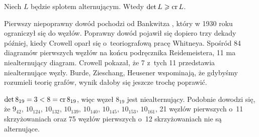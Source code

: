 

\begin{proposition}
%
\label{prp:bankwitz}%
    Niech $L$ będzie splotem alternującym.
    Wtedy $\det L \geqslant \operatorname{cr} L$.
\end{proposition}

Pierwszy niepoprawny dowód pochodzi od Bankwitza \cite{bankwitz1930}, który w 1930 roku ograniczył się do węzłów.
%
Poprawny dowód pojawił się dopiero trzy dekady później, kiedy Crowell \cite{crowell1959} oparł się o~teoriografową pracę Whitneya.
%
%
Spośród 84 diagramów pierwszych węzłów na końcu podręcznika Reidemeistera, 11 ma niealternujący diagram.
Crowell pokazał, że 7 z~tych 11 przedstawia niealternujące węzły.
Burde, Zieschang, Heusener \cite[s. 265]{burde2014} wspominają, że gdybyśmy rozumieli teorię grafów, wynik dałoby się jeszcze trochę poprawić.

\begin{example}
    $\det 8_{19} = 3 < 8 = \operatorname{cr} 8_{19}$, więc węzeł $8_{19}$ jest niealternujący.
    Podobnie dowodzi się, że $9_{42}$, $10_{124}$, $10_{132}$, $10_{139}$, $10_{140}$, $10_{145}$, $10_{153}$, $10_{161}$, 21 węzłów pierwszych o~11 skrzyżowaniach oraz 75 węzłów pierwszych o~12 skrzyżowaniach nie są alternujące.
\end{example}

